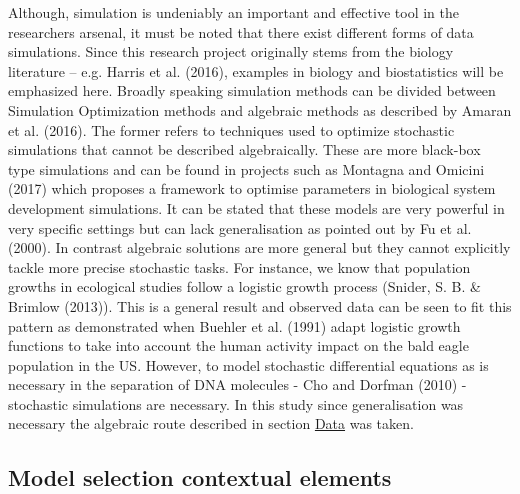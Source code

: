 \documentclass[]{article}
\begin{document}
Although, simulation is undeniably an important and effective tool in
the researchers arsenal, it must be noted that there exist different
forms of data simulations. Since this research project originally stems
from the biology literature -- e.g. Harris et al. (2016), examples in
biology and biostatistics will be emphasized here. Broadly speaking
simulation methods can be divided between Simulation Optimization
methods and algebraic methods as described by Amaran et al. (2016). The
former refers to techniques used to optimize stochastic simulations that
cannot be described algebraically. These are more black-box type
simulations and can be found in projects such as Montagna and Omicini
(2017) which proposes a framework to optimise parameters in biological
system development simulations. It can be stated that these models are
very powerful in very specific settings but can lack generalisation as
pointed out by Fu et al. (2000). In contrast algebraic solutions are
more general but they cannot explicitly tackle more precise stochastic
tasks. For instance, we know that population growths in ecological
studies follow a logistic growth process (Snider, S. B. \& Brimlow
(2013)). This is a general result and observed data can be seen to fit
this pattern as demonstrated when Buehler et al. (1991) adapt logistic
growth functions to take into account the human activity impact on the
bald eagle population in the US. However, to model stochastic
differential equations as is necessary in the separation of DNA
molecules - Cho and Dorfman (2010) - stochastic simulations are
necessary. In this study since generalisation was necessary the
algebraic route described in section \protect\hyperlink{data}{Data} was
taken.

\hypertarget{model-selection-contextual-elements}{%
\subsection{Model selection contextual
elements}\label{model-selection-contextual-elements}}
\end{document}
